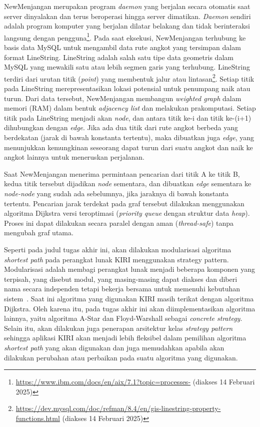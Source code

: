 NewMenjangan merupakan program \textit{daemon} yang berjalan secara otomatis saat server dinyalakan dan terus beroperasi hingga server dimatikan. \textit{Daemon} sendiri adalah program komputer yang berjalan dilatar belakang dan tidak berinteraksi langsung dengan pengguna\footnote{\url{https://www.ibm.com/docs/en/aix/7.1?topic=processes-} (diakses 14 Februari 2025)}. Pada saat eksekusi, NewMenjangan terhubung ke basis data MySQL untuk mengambil data rute angkot yang tersimpan dalam format LineString. LineString adalah salah satu tipe data geometris dalam MySQL yang mewakili satu atau lebih segmen garis yang terhubung. LineString terdiri dari urutan titik (\textit{point}) yang membentuk jalur atau lintasan\footnote{\url{https://dev.mysql.com/doc/refman/8.4/en/gis-linestring-property-functions.html} (diakses 14 Februari 2025)}. Setiap titik pada LineString merepresentasikan lokasi potensial untuk penumpang naik atau turun. Dari data tersebut, NewMenjangan membangun \textit{weighted graph} dalam memori (RAM) dalam bentuk \textit{adjacency list} dan melakukan prakomputasi. Setiap titik pada LineString menjadi akan \textit{node}, dan antara titik ke-i dan titik ke-(i+1) dihubungkan dengan \textit{edge}. Jika ada dua titik dari rute angkot berbeda yang berdekatan (jarak di bawah konstanta tertentu), maka dibuatkan juga \textit{edge}, yang menunjukkan kemungkinan seseorang dapat turun dari suatu angkot dan naik ke angkot lainnya untuk meneruskan perjalanan. 
\newpage

Saat NewMenjangan menerima permintaan pencarian dari titik A ke titik B, kedua titik tersebut dijadikan \textit{node} sementara, dan dibuatkan \textit{edge} sementara ke \textit{node-node} yang sudah ada sebelumnya, jika jaraknya di bawah konstanta tertentu. Pencarian jarak terdekat pada graf tersebut dilakukan menggunakan algoritma Dijkstra versi teroptimasi (\textit{priority queue} dengan struktur data \textit{heap}). Proses ini dapat dilakukan secara paralel dengan aman (\textit{thread-safe}) tanpa mengubah graf utama.

Seperti pada judul tugas akhir ini, akan dilakukan modularisasi algoritma \textit{shortest path} pada perangkat lunak KIRI menggunakan strategy pattern. Modularisasi adalah membagi perangkat lunak menjadi beberapa komponen yang terpisah, yang disebut modul, yang masing-masing dapat diakses dan diberi nama secara independen tetapi bekerja bersama untuk memenuhi kebutuhan sistem~\cite{Pressman:19:Software}. Saat ini algoritma yang digunakan KIRI masih terikat dengan algoritma Dijkstra. Oleh karena itu, pada tugas akhir ini akan diimplementasikan algoritma lainnya, yaitu algoritma A-Star dan Floyd-Warshall sebagai \textit{concrete strategy}. Selain itu, akan dilakukan juga penerapan arsitektur kelas \textit{strategy pattern} sehingga aplikasi KIRI akan menjadi lebih fleksibel dalam pemilihan algoritma \textit{shortest path} yang akan digunakan dan juga memudahkan apabila akan dilakukan perubahan atau perbaikan pada suatu algoritma yang digunakan.

